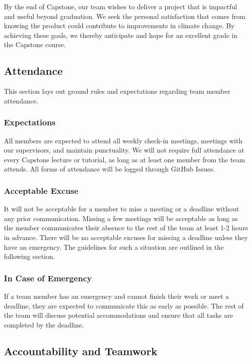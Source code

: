 \documentclass{article}
\begin{document}
By the end of Capstone, our team wishes to deliver a project that is impactful
and useful beyond graduation. We seek the personal satisfaction that comes from
knowing the product could contribute to improvements in climate change. By achieving 
these goals, we thereby anticipate and hope for an excellent grade in the Capstone
course.

\subsection*{Attendance}

This section lays out ground rules and expectations regarding team member attendance.

\subsubsection*{Expectations}

All members are expected to attend all weekly check-in meetings, meetings with our
supervisors, and maintain punctuality. We will not require full attendance at every
Capstone lecture or tutorial, as long as at least one member from the team attends.
All forms of attendance will be logged through GitHub Issues.

\subsubsection*{Acceptable Excuse}

It will not be acceptable for a member to miss a meeting or a deadline without any
prior communication. Missing a few meetings will be acceptable as long as the member
communicates their absence to the rest of the team at least 1-2 hours in advance.
There will be no acceptable excuses for missing a deadline unless they have an 
emergency. The guidelines for such a situation are outlined in the following section.

\subsubsection*{In Case of Emergency}

If a team member has an emergency and cannot finish their work or meet a deadline,
they are expected to communicate this as early as possible. The rest of the team will
discuss potential accommodations and ensure that all tasks are completed by the
deadline.

\subsection*{Accountability and Teamwork}
\end{document}
